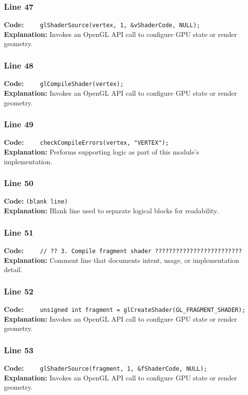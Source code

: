 \documentclass[11pt,a4paper]{article}
\begin{document}
\subsubsection*{Line 47}
\textbf{Code:} \verb|    glShaderSource(vertex, 1, &vShaderCode, NULL);|\\
\textbf{Explanation:} Invokes an OpenGL API call to configure GPU state or render geometry.

\subsubsection*{Line 48}
\textbf{Code:} \verb|    glCompileShader(vertex);|\\
\textbf{Explanation:} Invokes an OpenGL API call to configure GPU state or render geometry.

\subsubsection*{Line 49}
\textbf{Code:} \verb|    checkCompileErrors(vertex, "VERTEX");|\\
\textbf{Explanation:} Performs supporting logic as part of this module's implementation.

\subsubsection*{Line 50}
\textbf{Code:} \texttt{(blank line)}\\
\textbf{Explanation:} Blank line used to separate logical blocks for readability.

\subsubsection*{Line 51}
\textbf{Code:} \verb|    // ?? 3. Compile fragment shader ?????????????????????????|\\
\textbf{Explanation:} Comment line that documents intent, usage, or implementation detail.

\subsubsection*{Line 52}
\textbf{Code:} \verb|    unsigned int fragment = glCreateShader(GL_FRAGMENT_SHADER);|\\
\textbf{Explanation:} Invokes an OpenGL API call to configure GPU state or render geometry.

\subsubsection*{Line 53}
\textbf{Code:} \verb|    glShaderSource(fragment, 1, &fShaderCode, NULL);|\\
\textbf{Explanation:} Invokes an OpenGL API call to configure GPU state or render geometry.
\end{document}
